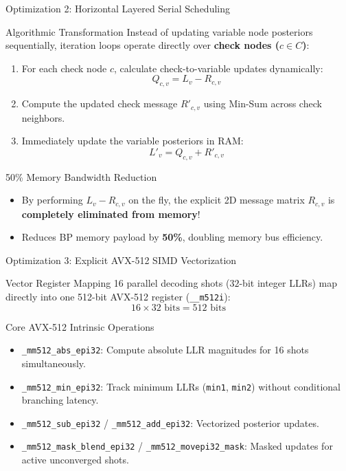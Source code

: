 \begin{frame}{Optimization 2: Horizontal Layered Serial Scheduling}
    \begin{block}{Algorithmic Transformation}
        Instead of updating variable node posteriors sequentially, iteration loops operate directly over \textbf{check nodes ($c \in C$)}:
        \begin{enumerate}
            \item For each check node $c$, calculate check-to-variable updates dynamically:
                  $$Q_{c,v} = L_v - R_{c,v}$$
            \item Compute the updated check message $R'_{c,v}$ using Min-Sum across check neighbors.
            \item Immediately update the variable posteriors in RAM:
                  $$L'_v = Q_{c,v} + R'_{c,v}$$
        \end{enumerate}
    \end{block}
    
    \begin{block}{50\% Memory Bandwidth Reduction}
        \begin{itemize}
            \item By performing $L_v - R_{c,v}$ on the fly, the explicit 2D message matrix $R_{c,v}$ is \textbf{completely eliminated from memory}!
            \item Reduces BP memory payload by \textbf{50\%}, doubling memory bus efficiency.
        \end{itemize}
    \end{block}
\end{frame}

\begin{frame}{Optimization 3: Explicit AVX-512 SIMD Vectorization}
    \begin{block}{Vector Register Mapping}
        16 parallel decoding shots ($32$-bit integer LLRs) map directly into one 512-bit AVX-512 register (\texttt{\_\_m512i}):
        $$16 \times 32 \text{ bits} = 512 \text{ bits}$$
    \end{block}
    
    \begin{block}{Core AVX-512 Intrinsic Operations}
        \begin{itemize}
            \item \texttt{\_mm512\_abs\_epi32}: Compute absolute LLR magnitudes for 16 shots simultaneously.
            \item \texttt{\_mm512\_min\_epi32}: Track minimum LLRs (\texttt{min1}, \texttt{min2}) without conditional branching latency.
            \item \texttt{\_mm512\_sub\_epi32} / \texttt{\_mm512\_add\_epi32}: Vectorized posterior updates.
            \item \texttt{\_mm512\_mask\_blend\_epi32} / \texttt{\_mm512\_movepi32\_mask}: Masked updates for active unconverged shots.
        \end{itemize}
    \end{block}
\end{frame}


